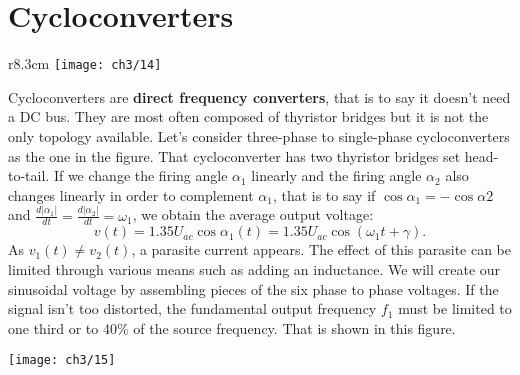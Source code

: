 	\section{Cycloconverters}
		\begin{wrapfigure}[12]{r}{8.3cm}
		\vspace{-5mm}
		\texttt{[image: ch3/14]}
		\label{fig:3.14}
		\end{wrapfigure}
		Cycloconverters are \textbf{direct frequency converters}, that is to say it doesn't need a DC bus. They are most often composed of thyristor bridges but it is not the only topology available. Let's consider three-phase to single-phase cycloconverters as the one in the figure. That cycloconverter has two thyristor bridges set head-to-tail. If we change  the firing angle $\alpha_1$ linearly and the firing angle $\alpha_2$ also changes linearly in order to complement $\alpha_1$, that is to say if $\cos \alpha _1 = - \cos \alpha 2$ and $\frac{d|\alpha _1|}{dt} = \frac{d|\alpha _2|}{dt} = \omega _1$, we obtain the average output voltage: 
		\begin{equation}
			v(t) = 1.35 U_{ac} \cos \alpha _1 (t) = 1.35 U_{ac} \cos (\omega _1 t + \gamma). 
		\end{equation}
		As $v_1(t) \neq v_2(t)$, a parasite current appears. The effect of this parasite can be limited through various means such as adding an inductance. We will create our sinusoidal voltage by assembling pieces of the six phase to phase voltages. If the signal isn't too distorted, the fundamental output frequency $f_1$ must be limited to one third or to 40\% of the source frequency. That is shown in this figure. 
		
		\begin{center}
			\texttt{[image: ch3/15]}
		\end{center}